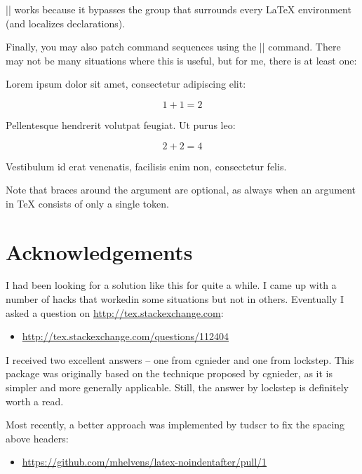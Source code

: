 \documentclass[a4paper]{noindentafter-packagedoc}
\begin{document}
|\NoIndentAfterEnv| works because it bypasses the group
that surrounds every \LaTeX{} environment (and localizes
declarations). 




Finally, you may also patch command sequences using the
|\NoIndentAfterCmd| command. There may not be many situations
where this is useful, but for me, there is at least one:

\begin{latex-example-show}
	Lorem ipsum dolor sit amet, consectetur adipiscing elit:
	
	\[ 1 + 1 = 2 \]
	
	Pellentesque hendrerit volutpat feugiat. Ut purus leo:
	
	\NoIndentAfterCmd \]
	
	\[ 2 + 2 = 4 \]
	
	Vestibulum id erat venenatis, facilisis enim non,
	consectetur felis.
\end{latex-example-show}

Note that braces around the  argument are
optional, as always when an argument in \TeX{} consists
of only a single token.



\section{Acknowledgements}                                                     %

I had been looking for a solution like this for quite a while. I came up
with a number of hacks that workedin some situations but not in others.
Eventually I asked a question on \url{http://tex.stackexchange.com}:
\begin{itemize}
  \item \url{http://tex.stackexchange.com/questions/112404}
\end{itemize}

I received two excellent answers -- one from cgnieder and one from lockstep.
This package was originally based on the technique proposed by cgnieder, as
it is simpler and more generally applicable. Still, the answer by lockstep
is definitely worth a read.

Most recently, a better approach was implemented by tudscr to fix the spacing
above headers:
\begin{itemize}
  \item \url{https://github.com/mhelvens/latex-noindentafter/pull/1}
\end{itemize}

\end{document}
